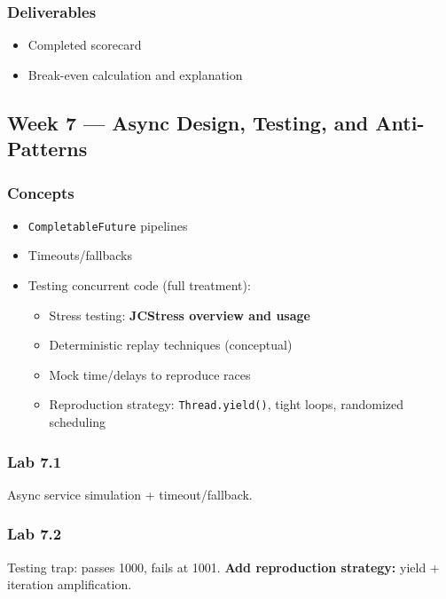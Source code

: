 \documentclass[11pt,a4paper]{article}
\begin{document}
	\subsubsection*{Deliverables}
	\begin{itemize}[leftmargin=*]
		\item Completed scorecard
		\item Break-even calculation and explanation
	\end{itemize}
	
	\subsection*{Week 7 --- Async Design, Testing, and Anti-Patterns}
	
	\subsubsection*{Concepts}
	\begin{itemize}[leftmargin=*]
		\item \texttt{CompletableFuture} pipelines
		\item Timeouts/fallbacks
		\item Testing concurrent code (full treatment):
		\begin{itemize}[leftmargin=*]
			\item Stress testing: \textbf{JCStress overview and usage}
			\item Deterministic replay techniques (conceptual)
			\item Mock time/delays to reproduce races
			\item Reproduction strategy: \texttt{Thread.yield()}, tight loops, randomized scheduling
		\end{itemize}
	\end{itemize}
	
	\subsubsection*{Lab 7.1}
	Async service simulation + timeout/fallback.
	
	\subsubsection*{Lab 7.2}
	Testing trap: passes 1000, fails at 1001.  
	\textbf{Add reproduction strategy:} yield + iteration amplification.
	
\end{document}

